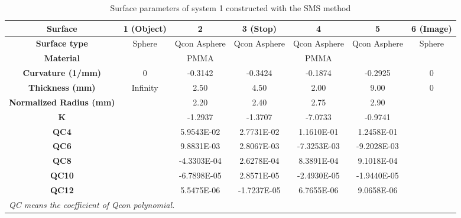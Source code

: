 \setlength{\arrayrulewidth}{.5mm}
\setlength{\tabcolsep}{18pt}
\renewcommand{\arraystretch}{1.2}
\begin{table}[h!]
    \centering
    \captionsetup{justification=centering}
    \caption{Surface parameters of system 1 constructed with the SMS method}
    \label{table: chap5 - sys1 - SMS}
    \vspace{-1em}
    \begin{adjustbox}{max width=\textwidth, center}
    \begin{tabular}{c c c c c c c}
    \hline 
     \textbf{Surface} & \textbf{1 (Object)} & \textbf{2} & \textbf{3 (Stop)} & \textbf{4} & \textbf{5} & \textbf{6 (Image)}\\ 
     \midrule
    \rowcolor[gray]{0.9}  \textbf{Surface type} & Sphere & Qcon Asphere & Qcon Asphere & Qcon Asphere & Qcon Asphere & Sphere \\ 
    \textbf{Material} &  & PMMA &  & PMMA & & \\
   \rowcolor[gray]{0.9}  \textbf{Curvature (1/mm)} & 0 & -0.3142 & -0.3424 & -0.1874 &-0.2925 & 0\\
    \textbf{Thickness (mm)} & Infinity & 2.50 & 4.50 & 2.00 & 9.00 & 0 \\ 
    \rowcolor[gray]{0.9} \textbf{Normalized Radius (mm)} & & 2.20 & 2.40 & 2.75 & 2.90 & \\
    \textbf{K} & & -1.2937 & -1.3707 & -7.0733 & -0.9741&\\
    \rowcolor[gray]{0.9} \textbf{QC4} & & 5.9543E-02 & 2.7731E-02 & 1.1610E-01 &  1.2458E-01 &  \\ 
    \textbf{QC6} & &  9.8831E-03 & 2.8067E-03 & -7.3253E-03 & -9.2028E-03 &\\
   \rowcolor[gray]{0.9}  \textbf{QC8} & & -4.3303E-04 &  2.6278E-04 &  8.3891E-04 &  9.1018E-04 & \\
    \textbf{QC10} & & -6.7898E-05 &  2.8571E-05 & -2.4930E-05 & -1.9440E-05 & \\ 
   \rowcolor[gray]{0.9}  \textbf{QC12} & &  5.5475E-06 & -1.7237E-05 &  6.7655E-06 &  9.0658E-06 &\\
    \hline
    \multicolumn{6}{l}{\textit{\footnotesize{QC means the coefficient of Qcon polynomial.}}}\\
    \end{tabular}
    \end{adjustbox}
\end{table}

